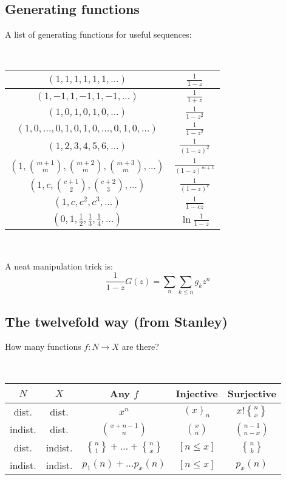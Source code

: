 \documentclass[a4paper]{amsart}
\newcommand{\stirlingsecond}[2]{\genfrac{\{}{\}}{0pt}{}{#1}{#2}}
\begin{document}
\begin{multicols}{2}
    \subsection{Generating functions}
      A list of generating functions for useful sequences:

      \ 

      \begin{tabular}{|c|c|}
        \hline 
        $(1,1,1,1,1,1,\ldots)$ & $\frac{1}{1-z}$ \\ \hline
        $(1,-1,1,-1,1,-1,\ldots)$ & $\frac{1}{1+z}$ \\ \hline
        $(1,0,1,0,1,0,\ldots)$ & $\frac{1}{1-z^2}$ \\ \hline        
        $(1,0,\ldots,0,1,0,1,0,\ldots,0,1,0,\ldots)$ & $\frac{1}{1-z^2}$ \\ \hline
        $(1,2,3,4,5,6,\ldots)$ & $\frac{1}{(1-z)^2}$ \\ \hline
        $(1,\binom{m+1}{m},\binom{m+2}{m},\binom{m+3}{m},\ldots)$ & $\frac{1}{(1-z)^{m+1}}$ \\ \hline
        $(1,c,\binom{c+1}{2},\binom{c+2}{3},\ldots)$ & $\frac{1}{(1-z)^c}$ \\ \hline    
        $(1,c,c^2, c^3, \ldots)$ & $\frac{1}{1-cz}$ \\ \hline    
        $(0,1,\frac{1}{2},\frac{1}{3},\frac{1}{4},\ldots)$ & $\ln \frac{1}{1-z}$ \\ \hline    
      \end{tabular}      

      \ 

      A neat manipulation trick is:
      \begin{equation*}
        \frac{1}{1-z}G(z) = \sum_{n}\sum_{k\leq n}g_kz^n
      \end{equation*}

    \subsection{The twelvefold way (from Stanley)} How many functions $f \colon N \rightarrow X$ are there?

      \ 

      \begin{tabular}{|c|c|c|c|c|}
        \hline
        $N$ & $X$ & Any $f$ & Injective & Surjective \\ \hline
        dist. & dist. & $x^n$ & $(x)_n$ & $x! \stirlingsecond{n}{x}$ \\ \hline
        indist. & dist. & $\binom{x+n-1}{n}$ & $\binom{x}{n}$ & $\binom{n-1}{n-x}$ \\ \hline
        dist. & indist. & $\stirlingsecond{n}{1} + \ldots + \stirlingsecond{n}{x}$ & $[n \leq x]$ & $\stirlingsecond{n}{k}$ \\ \hline
        indist. & indist. & $p_1(n) + \ldots p_x(n)$ & $[n \leq x]$ & $p_x(n)$ \\ \hline
      \end{tabular}


\end{multicols}
\end{document}
